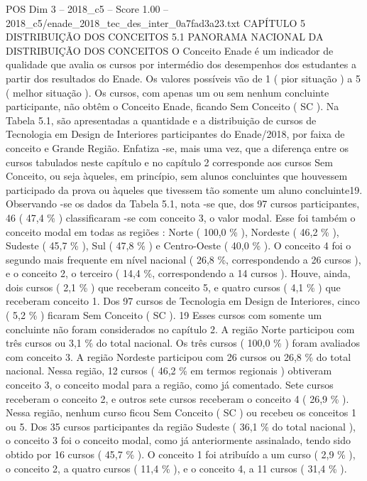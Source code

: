 \begin{textsample}{POS Dim 3 – 2018\_c5 – Score 1.00 – 2018\_c5/enade\_2018\_tec\_des\_inter\_0a7fad3a23.txt}  \label{ex:f3_pos_186}
CAPÍTULO 5 DISTRIBUIÇÃO DOS CONCEITOS 5.1 PANORAMA NACIONAL DA DISTRIBUIÇÃO DOS CONCEITOS O Conceito Enade é um indicador de qualidade que avalia os cursos por intermédio dos desempenhos dos estudantes a partir dos resultados do Enade.
Os valores possíveis vão de 1 ( pior situação ) a 5 ( melhor situação ).
Os cursos, com apenas um ou sem nenhum concluinte participante, não obtêm o Conceito Enade, ficando Sem Conceito ( SC ).
Na Tabela 5.1, são apresentadas a quantidade e a distribuição de cursos de Tecnologia em Design de Interiores participantes do Enade/2018, por faixa de conceito e Grande Região.
Enfatiza -se, mais uma vez, que a diferença entre os cursos tabulados neste capítulo e no capítulo 2 corresponde aos cursos Sem Conceito, ou seja àqueles, em princípio, sem alunos concluintes que houvessem participado da prova ou àqueles que tivessem tão somente um aluno concluinte19.
Observando -se os dados da Tabela 5.1, nota -se que, dos 97 cursos participantes, 46 ( 47,4 \% ) classificaram -se com conceito 3, o valor modal.
Esse foi também o conceito modal em todas as regiões : Norte ( 100,0 \% ), Nordeste ( 46,2 \% ), Sudeste ( 45,7 \% ), Sul ( 47,8 \% ) e Centro-Oeste ( 40,0 \% ).
O conceito 4 foi o segundo mais frequente em nível nacional ( 26,8 \%, correspondendo a 26 cursos ), e o conceito 2, o terceiro ( 14,4 \%, correspondendo a 14 cursos ).
Houve, ainda, dois cursos ( 2,1 \% ) que receberam conceito 5, e quatro cursos ( 4,1 \% ) que receberam conceito 1.
Dos 97 cursos de Tecnologia em Design de Interiores, cinco ( 5,2 \% ) ficaram Sem Conceito ( SC ). 19 Esses cursos com somente um concluinte não foram considerados no capítulo 2.
A região Norte participou com três cursos ou 3,1 \% do total nacional.
Os três cursos ( 100,0 \% ) foram avaliados com conceito 3.
A região Nordeste participou com 26 cursos ou 26,8 \% do total nacional.
Nessa região, 12 cursos ( 46,2 \% em termos regionais ) obtiveram conceito 3, o conceito modal para a região, como já comentado.
Sete cursos receberam o conceito 2, e outros sete cursos receberam o conceito 4 ( 26,9 \% ).
Nessa região, nenhum curso ficou Sem Conceito ( SC ) ou recebeu os conceitos 1 ou 5.
Dos 35 cursos participantes da região Sudeste ( 36,1 \% do total nacional ), o conceito 3 foi o conceito modal, como já anteriormente assinalado, tendo sido obtido por 16 cursos ( 45,7 \% ).
O conceito 1 foi atribuído a um curso ( 2,9 \% ), o conceito 2, a quatro cursos ( 11,4 \% ), e o conceito 4, a 11 cursos ( 31,4 \% ).

\end{textsample}
